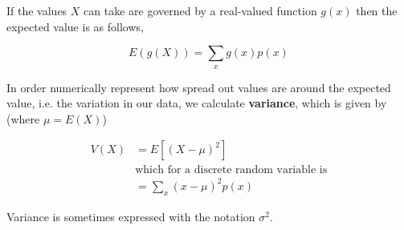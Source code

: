 If the values $X$ can take are governed by a real-valued function $g(x)$ then the expected value is as follows,

\begin{equation*}
	E(g(X)) = \sum_{x}g(x)p(x)
\end{equation*}

In order numerically represent how spread out values are around the expected value, i.e. the variation in our data, we calculate \textbf{variance},
which is given by (where $\mu = E(X)$)

\begin{align*}
	V(X)&=E[(X-\mu)^2]\\
	& \textrm{which for a discrete random variable is} \\
	&=\sum_{x}(x-\mu)^{2}p(x)
\end{align*}

Variance is sometimes expressed with the notation $\sigma ^2$.

